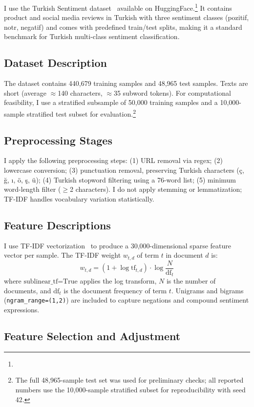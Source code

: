 \documentclass[conference]{IEEEtran}
\begin{document}
I use the Turkish Sentiment dataset~\cite{b_trsentiment} available on HuggingFace.\footnote{}
It contains product and social media reviews in Turkish with three sentiment
classes (pozitif, notr, negatif) and comes with predefined train/test splits, making
it a standard benchmark for Turkish multi-class sentiment classification.

\subsection{Dataset Description}

The dataset contains 440,679 training samples and 48,965 test samples. Texts are short
(average $\approx$140 characters, $\approx$35 subword tokens). For computational
feasibility, I use a stratified subsample of 50,000 training samples and a 10,000-sample
stratified test subset for evaluation.\footnote{The full 48,965-sample test set was used
for preliminary checks; all reported numbers use the 10,000-sample stratified subset for
reproducibility with seed 42.}

\subsection{Preprocessing Stages}

I apply the following preprocessing steps:
(1) URL removal via regex; (2) lowercase conversion; (3) punctuation removal, preserving
Turkish characters (ç, ğ, ı, ö, ş, ü); (4) Turkish stopword filtering using a 76-word
list; (5) minimum word-length filter ($\geq$2 characters). I do not apply stemming or
lemmatization; TF-IDF handles vocabulary variation statistically.

\subsection{Feature Descriptions}

I use TF-IDF vectorization~\cite{b_tfidf} to produce a 30,000-dimensional sparse feature vector per
sample. The TF-IDF weight $w_{t,d}$ of term $t$ in document $d$ is:
\[
w_{t,d} = (1 + \log \text{tf}_{t,d}) \cdot \log \frac{N}{\text{df}_t}
\]
where $\text{sublinear\_tf=True}$ applies the log transform, $N$ is the number of
documents, and $\text{df}_t$ is the document frequency of term $t$. Unigrams and
bigrams (\texttt{ngram\_range=(1,2)}) are included to capture negations and compound
sentiment expressions.

\subsection{Feature Selection and Adjustment}
\end{document}
